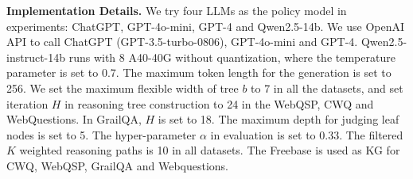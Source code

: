 \documentclass[lettersize,journal]{IEEEtran}
\begin{document}
\noindent \textbf{Implementation Details.} We try four LLMs as the policy model in experiments: ChatGPT, GPT-4o-mini, GPT-4 and Qwen2.5-14b. We use OpenAI API to call ChatGPT (GPT-3.5-turbo-0806), GPT-4o-mini and GPT-4. Qwen2.5-instruct-14b runs with 8 A40-40G without quantization, where the temperature parameter is set to 0.7. The maximum token length for the generation is set to 256. We set the maximum flexible width of tree $b$ to 7 in all the datasets, and set iteration $H$ in reasoning tree construction to 24 in the WebQSP, CWQ and WebQuestions. In GrailQA, $H$ is set to 18. The maximum depth for judging leaf nodes is set to 5. The hyper-parameter $\alpha$ in evaluation is set to 0.33. The filtered $K$ weighted reasoning paths is 10 in all datasets. The Freebase is used as KG for CWQ, WebQSP, GrailQA and Webquestions.
\end{document}

